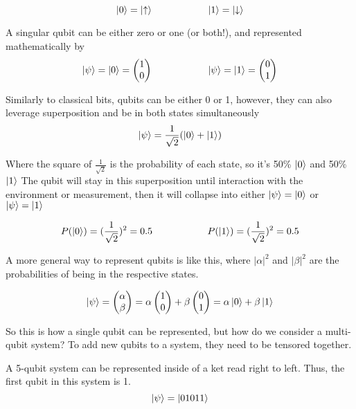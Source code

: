 \documentclass[12pt]{article}
\begin{document}
$$
\ket{0} = \ket{\uparrow} \hspace{2cm} \ket{1} = \ket{\downarrow}
$$


A singular qubit can be either zero or one (or both!), and represented mathematically by
$$
\ket{\psi} = \ket{0} = \begin{pmatrix} 1 \\ 0 \end{pmatrix} \hspace{2cm} \ket{\psi} = \ket{1} = \begin{pmatrix} 0 \\ 1 \end{pmatrix}
$$

Similarly to classical bits, qubits can be either 0 or 1, however, they can also leverage superposition and be in both states simultaneously
$$
\ket{\psi} = \frac{1}{\sqrt{2}} (\ket{0} + \ket{1})
$$

Where the square of $\frac{1}{\sqrt{2}}$ is the probability of each state, so it's 50\% $\ket{0}$ and 50\% $\ket{1}$ The qubit will stay in this superposition until interaction with the environment or measurement, then it will collapse into either $\ket{\psi} = \ket{0}$ or $\ket{\psi} =\ket{1}$

$$
P(\ket{0}) = (\frac{1}{\sqrt{2}})^2 = 0.5 \hspace{2cm} P(\ket{1}) = (\frac{1}{\sqrt{2}})^2 = 0.5 
$$

A more general way to represent qubits is like this, where $|\alpha|^2$ and $|\beta|^2$ are the probabilities of being in the respective states.

$$
\ket{\psi} = 
\begin{pmatrix}
    \alpha \\
    \beta
\end{pmatrix} = 
\alpha \begin{pmatrix} 1 \\ 0 \end{pmatrix} + 
\beta \begin{pmatrix} 0 \\ 1 \end{pmatrix} =
\alpha\ket{0} + \beta\ket{1}
$$

So this is how a single qubit can be represented, but how do we consider a multi-qubit system? To add new qubits to a system, they need to be tensored together.

A 5-qubit system can be represented inside of a ket read right to left. Thus, the first qubit in this system is 1.
$$
\ket{\psi} = \ket{01011}
$$
\end{document}
